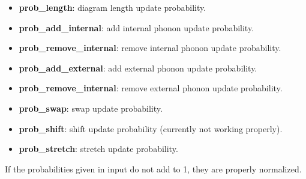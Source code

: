 \begin{itemize}
    \item \textbf{prob\_length}: diagram length update probability.
    \item \textbf{prob\_add\_internal}: add internal phonon update probability.
    \item \textbf{prob\_remove\_internal}: remove internal phonon update probability.
    \item \textbf{prob\_add\_external}: add external phonon update probability.
    \item \textbf{prob\_remove\_internal}: remove external phonon update probability.
    \item \textbf{prob\_swap}: swap update probability.
    \item \textbf{prob\_shift}: shift update probability (currently not working properly).
    \item \textbf{prob\_stretch}: stretch update probability.
\end{itemize}
If the probabilities given in input do not add to 1, they are properly normalized.